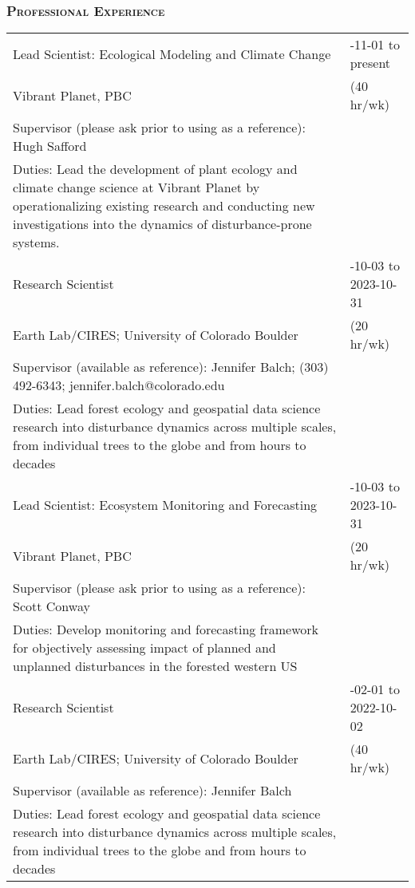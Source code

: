 \documentclass[10pt,english]{article}
\providecommand{\tabularnewline}{\\}
\begin{document}

\subsubsection*{\textsc{Professional Experience}}
\vspace{-0.5ex}

\renewcommand{\arraystretch}{1.2}
\begin{tabularx}{\textwidth}{@{}>{\raggedright}p{4.5in} >{\raggedleft}X@{}}

Lead Scientist: Ecological Modeling and Climate Change & 2023-11-01 to present \tabularnewline
\addtolength{\leftskip}{5ex}Vibrant Planet, PBC & (40 hr/wk) \tabularnewline
\addtolength{\leftskip}{5ex}Supervisor (please ask prior to using as a reference): Hugh Safford & \tabularnewline
\addtolength{\leftskip}{5ex}Duties: Lead the development of plant ecology and climate change science at Vibrant Planet by operationalizing existing research and conducting new investigations into the dynamics of disturbance-prone systems. & \tabularnewline

Research Scientist & 2022-10-03 to 2023-10-31 \tabularnewline
\addtolength{\leftskip}{5ex}Earth Lab/CIRES; University of Colorado Boulder & (20 hr/wk) \tabularnewline
\addtolength{\leftskip}{5ex}Supervisor (available as reference): Jennifer Balch; (303) 492-6343; jennifer.balch@colorado.edu & \tabularnewline
\addtolength{\leftskip}{5ex}Duties: Lead forest ecology and geospatial data science research into disturbance dynamics across multiple scales, from individual trees to the globe and from hours to decades  & \tabularnewline

Lead Scientist: Ecosystem Monitoring and Forecasting & 2022-10-03 to 2023-10-31 \tabularnewline
\addtolength{\leftskip}{5ex}Vibrant Planet, PBC & (20 hr/wk) \tabularnewline
\addtolength{\leftskip}{5ex}Supervisor (please ask prior to using as a reference): Scott Conway & \tabularnewline
\addtolength{\leftskip}{5ex}Duties: Develop monitoring and forecasting framework for objectively assessing impact of planned and unplanned disturbances in the forested western US & \tabularnewline

Research Scientist & 2021-02-01 to 2022-10-02 \tabularnewline
\addtolength{\leftskip}{5ex}Earth Lab/CIRES; University of Colorado Boulder & (40 hr/wk) \tabularnewline
\addtolength{\leftskip}{5ex}Supervisor (available as reference): Jennifer Balch & \tabularnewline
\addtolength{\leftskip}{5ex}Duties: Lead forest ecology and geospatial data science research into disturbance dynamics across multiple scales, from individual trees to the globe and from hours to decades  & \tabularnewline


\end{tabularx}
\end{document}
